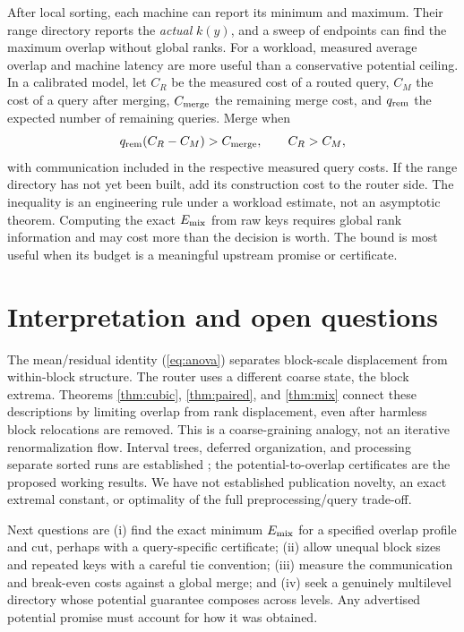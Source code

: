 \documentclass[10pt,letterpaper]{article}
\begin{document}
After local sorting, each machine can report its minimum and maximum. Their range directory reports the \emph{actual} $k(y)$, and a sweep of endpoints can find the maximum overlap without global ranks. For a workload, measured average overlap and machine latency are more useful than a conservative potential ceiling. In a calibrated model, let $C_R$ be the measured cost of a routed query, $C_M$ the cost of a query after merging, $C_{\rm merge}$ the remaining merge cost, and $q_{\rm rem}$ the expected number of remaining queries. Merge when
\begin{equation}\label{eq:decision}
 q_{\rm rem}(C_R-C_M)>C_{\rm merge},\qquad C_R>C_M,
\end{equation}
with communication included in the respective measured query costs. If the range directory has not yet been built, add its construction cost to the router side. The inequality is an engineering rule under a workload estimate, not an asymptotic theorem. Computing the exact $E_{\rm mix}$ from raw keys requires global rank information and may cost more than the decision is worth. The bound is most useful when its budget is a meaningful upstream promise or certificate.

\section{Interpretation and open questions}
The mean/residual identity (\ref{eq:anova}) separates block-scale displacement from within-block structure. The router uses a different coarse state, the block extrema. Theorems \ref{thm:cubic}, \ref{thm:paired}, and \ref{thm:mix} connect these descriptions by limiting overlap from rank displacement, even after harmless block relocations are removed. This is a coarse-graining analogy, not an iterative renormalization flow. Interval trees, deferred organization, and processing separate sorted runs are established \cite{akram,barbay,albutiu}; the potential-to-overlap certificates are the proposed working results. We have not established publication novelty, an exact extremal constant, or optimality of the full preprocessing/query trade-off.

Next questions are (i) find the exact minimum $E_{\rm mix}$ for a specified overlap profile and cut, perhaps with a query-specific certificate; (ii) allow unequal block sizes and repeated keys with a careful tie convention; (iii) measure the communication and break-even costs against a global merge; and (iv) seek a genuinely multilevel directory whose potential guarantee composes across levels. Any advertised potential promise must account for how it was obtained.
\end{document}
